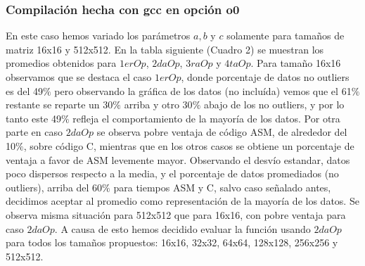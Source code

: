 \subsubsection{Compilación hecha con gcc en opción o0}
En este caso hemos variado los parámetros $a,b$ y $c$ solamente para tamaños de matriz 16x16 y 512x512. En la tabla siguiente (Cuadro 2) se muestran los promedios obtenidos para $1erOp$, $2daOp$, $3raOp$ y $4taOp$. 
Para tamaño 16x16 observamos que se destaca el caso $1erOp$, donde porcentaje de datos no outliers es del 49$\%$ pero observando la gráfica de los datos (no incluída) vemos que el 61$\%$ restante se reparte un 30$\%$ arriba y otro 30$\%$ abajo de los no outliers, y por lo tanto este 49$\%$ refleja el comportamiento de la mayoría de los datos. Por otra parte en caso $2daOp$ se observa pobre ventaja de código ASM, de alrededor del 10$\%$, sobre código C, mientras que en los otros casos se obtiene un porcentaje de ventaja a favor de ASM levemente mayor. Observando el desvío estandar, datos poco dispersos respecto a la media, y el porcentaje de datos promediados (no outliers), arriba del 60$\%$ para tiempos ASM y C, salvo caso señalado antes, decidimos aceptar al promedio como representación de la mayoría de los datos. Se observa misma situación para 512x512 que para 16x16, con pobre ventaja para caso $2daOp$. A causa de esto hemos decidido evaluar la función usando $2daOp$ para todos los tamaños propuestos: 16x16, 32x32, 64x64, 128x128, 256x256 y 512x512.
  
